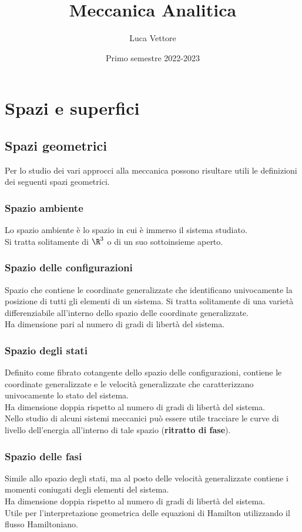 \documentclass{article}
\title{Meccanica Analitica}
\author{Luca Vettore}
\date{Primo semestre 2022-2023}
\begin{document}


\maketitle


\section{Spazi e superfici}

\subsection{Spazi geometrici}
Per lo studio dei vari approcci alla meccanica possono risultare utili le definizioni dei seguenti spazi geometrici.

\subsubsection{Spazio ambiente}
Lo spazio ambiente è lo spazio in cui è immerso il sistema studiato.\\
Si tratta solitamente di $\R^3$ o di un suo sottoinsieme aperto.

\subsubsection{Spazio delle configurazioni}
Spazio che contiene le coordinate generalizzate che identificano univocamente la posizione di tutti gli elementi di un sistema. Si tratta solitamente di una varietà differenziabile all'interno dello spazio delle coordinate generalizzate.\\
Ha dimensione pari al numero di gradi di libertà del sistema.

\subsubsection{Spazio degli stati}
Definito come fibrato cotangente dello spazio delle configurazioni, contiene le coordinate generalizzate e le velocità generalizzate che caratterizzano univocamente lo stato del sistema.\\
Ha dimensione doppia rispetto al numero di gradi di libertà del sistema.\\
Nello studio di alcuni sistemi meccanici può essere utile tracciare le curve di livello dell'energia all'interno di tale spazio (\textbf{ritratto di fase}).

\subsubsection{Spazio delle fasi}
Simile allo spazio degli stati, ma al posto delle velocità generalizzate contiene i momenti coniugati degli elementi del sistema.\\
Ha dimensione doppia rispetto al numero di gradi di libertà del sistema.\\
Utile per l'interpretazione geometrica delle equazioni di Hamilton utilizzando il flusso Hamiltoniano.
\end{document}
